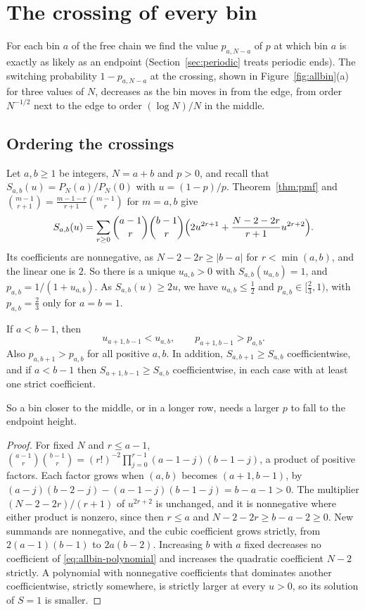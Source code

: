 \section{The crossing of every bin}\label{sec:allbin}

For each bin $a$ of the free chain we find the value $p_{a,N-a}$ of $p$ at
which bin $a$ is exactly as likely as an endpoint (Section~\ref{sec:periodic}
treats periodic ends). The switching probability $1-p_{a,N-a}$ at the
crossing, shown in Figure~\ref{fig:allbin}(a) for three values of $N$,
decreases as the bin moves in from
the edge, from order $N^{-1/2}$ next to the edge to order $(\log N)/N$ in the
middle.

\subsection{Ordering the crossings}\label{sec:allbin-order}

Let $a,b\ge1$ be integers, $N=a+b$ and $p>0$, and recall that
$S_{a,b}(u)=P_N(a)/P_N(0)$ with $u=(1-p)/p$. Theorem~\ref{thm:pmf} and
$\binom{m-1}{r+1}=\frac{m-1-r}{r+1}\binom{m-1}{r}$ for $m=a,b$ give
\begin{equation}\label{eq:allbin-polynomial}
 S_{a,b}(u)=\sum_{r\ge0}\binom{a-1}{r}\binom{b-1}{r}
 \Bigl(2u^{2r+1}+\frac{N-2-2r}{r+1}u^{2r+2}\Bigr).
\end{equation}
Its coefficients are nonnegative, as $N-2-2r\ge|b-a|$ for $r<\min(a,b)$, and
the linear one is $2$. So there is a unique $u_{a,b}>0$ with
$S_{a,b}(u_{a,b})=1$, and $p_{a,b}=1/(1+u_{a,b})$. As $S_{a,b}(u)\ge2u$, we
have $u_{a,b}\le\frac12$ and $p_{a,b}\in[\frac23,1)$, with $p_{a,b}=\frac23$
only for $a=b=1$.

\begin{proposition}\label{prop:allbin-order}
If $a<b-1$, then
\[
 u_{a+1,b-1}<u_{a,b},\qquad p_{a+1,b-1}>p_{a,b}.
\]
Also $p_{a,b+1}>p_{a,b}$ for all positive $a,b$. In addition,
$S_{a,b+1}\ge S_{a,b}$ coefficientwise, and if $a<b-1$ then
$S_{a+1,b-1}\ge S_{a,b}$ coefficientwise, in each case with at least one
strict coefficient.
\end{proposition}

So a bin closer to the middle, or in a longer row, needs a larger $p$ to fall
to the endpoint height.

\begin{proof}
For fixed $N$ and $r\le a-1$,
$\binom{a-1}{r}\binom{b-1}{r}=(r!)^{-2}\prod_{j=0}^{r-1}(a-1-j)(b-1-j)$, a
product of positive factors. Each factor grows when $(a,b)$ becomes
$(a+1,b-1)$, by $(a-j)(b-2-j)-(a-1-j)(b-1-j)=b-a-1>0$. The multiplier
$(N-2-2r)/(r+1)$ of $u^{2r+2}$ is unchanged, and it is nonnegative where either product is
nonzero, since then $r\le a$ and $N-2-2r\ge b-a-2\ge0$. New summands are
nonnegative, and the cubic coefficient grows strictly, from $2(a-1)(b-1)$ to
$2a(b-2)$. Increasing $b$ with $a$ fixed decreases no coefficient of
\eqref{eq:allbin-polynomial} and increases the quadratic coefficient $N-2$
strictly. A
polynomial with nonnegative coefficients that dominates another
coefficientwise, strictly somewhere, is strictly larger at every $u>0$, so its
solution of $S=1$ is smaller.
\end{proof}

